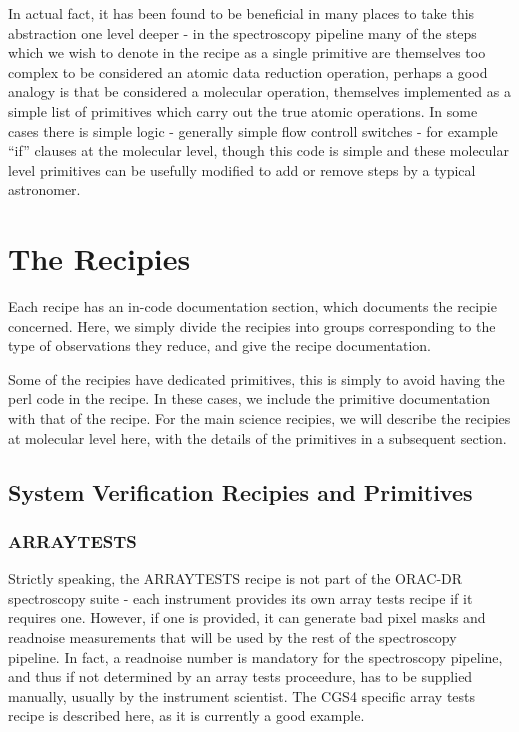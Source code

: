 \documentclass[twoside,11pt]{article}
\renewcommand{\_}{\texttt{\symbol{95}}}
\begin{document}
In actual fact, it has been found to be beneficial in many places to
take this abstraction one level deeper - in the spectroscopy pipeline
many of the steps which we wish to denote in the recipe as a single
primitive are themselves too complex to be considered an atomic data
reduction operation, perhaps a good analogy is that be considered a
molecular operation, themselves implemented as a simple list of
primitives which carry out the true atomic operations. In some cases
there is simple logic - generally simple flow controll switches - for
example ``if'' clauses at the molecular level, though this code is
simple and these molecular level primitives can be usefully modified
to add or remove steps by a typical astronomer.

\section{The Recipies}

Each recipe has an in-code documentation section, which documents the
recipie concerned. Here, we simply divide the recipies into groups
corresponding to the type of observations they reduce, and give the
recipe documentation.

Some of the recipies have dedicated primitives, this is simply to
avoid having the perl code in the recipe. In these cases, we include
the primitive documentation with that of the recipe. For the main
science recipies, we will describe the recipies at molecular level
here, with the details of the primitives in a subsequent section.

\subsection{System Verification Recipies and Primitives}

\subsubsection{ARRAY\_TESTS}

Strictly speaking, the ARRAY\_TESTS recipe is not part of the ORAC-DR
spectroscopy suite - each instrument provides its own array tests
recipe if it requires one. However, if one is provided, it can
generate bad pixel masks and readnoise measurements that will be used
by the rest of the spectroscopy pipeline. In fact, a readnoise number
is mandatory for the spectroscopy pipeline, and thus if not determined
by an array tests proceedure, has to be supplied manually, usually by
the instrument scientist. The CGS4 specific array tests recipe is
described here, as it is currently a good example.
\end{document}
